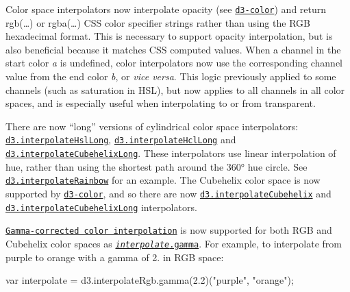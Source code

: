 Color space interpolators now interpolate opacity (see \href{#colors-d3-color}{\tt d3-\/color}) and return rgb(…) or rgba(…) C\+SS color specifier strings rather than using the R\+GB hexadecimal format. This is necessary to support opacity interpolation, but is also beneficial because it matches C\+SS computed values. When a channel in the start color {\itshape a} is undefined, color interpolators now use the corresponding channel value from the end color {\itshape b}, or {\itshape vice versa}. This logic previously applied to some channels (such as saturation in H\+SL), but now applies to all channels in all color spaces, and is especially useful when interpolating to or from transparent.

There are now “long” versions of cylindrical color space interpolators\+: \href{https://github.com/d3/d3-interpolate/blob/master/README.md#interpolateHslLong}{\tt d3.\+interpolate\+Hsl\+Long}, \href{https://github.com/d3/d3-interpolate/blob/master/README.md#interpolateHclLong}{\tt d3.\+interpolate\+Hcl\+Long} and \href{https://github.com/d3/d3-interpolate/blob/master/README.md#interpolateCubehelixLong}{\tt d3.\+interpolate\+Cubehelix\+Long}. These interpolators use linear interpolation of hue, rather than using the shortest path around the 360° hue circle. See \href{https://github.com/d3/d3-scale/blob/master/README.md#interpolateRainbow}{\tt d3.\+interpolate\+Rainbow} for an example. The Cubehelix color space is now supported by \href{#colors-d3-color}{\tt d3-\/color}, and so there are now \href{https://github.com/d3/d3-interpolate/blob/master/README.md#interpolateCubehelix}{\tt d3.\+interpolate\+Cubehelix} and \href{https://github.com/d3/d3-interpolate/blob/master/README.md#interpolateCubehelixLong}{\tt d3.\+interpolate\+Cubehelix\+Long} interpolators.

\href{https://web.archive.org/web/20160112115812/http://www.4p8.com/eric.brasseur/gamma.html}{\tt Gamma-\/corrected color interpolation} is now supported for both R\+GB and Cubehelix color spaces as \href{https://github.com/d3/d3-interpolate/blob/master/README.md#interpolate_gamma}{\tt {\itshape interpolate}.gamma}. For example, to interpolate from purple to orange with a gamma of 2. in R\+GB space\+:


\begin{DoxyCode}
var interpolate = d3.interpolateRgb.gamma(2.2)("purple", "orange");
\end{DoxyCode}


